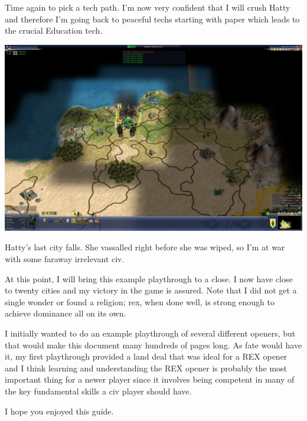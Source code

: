 \documentclass[10pt]{article}
\begin{document}
Time again to pick a tech path. I'm now very confident that I will crush Hatty and therefore I'm going back to
peaceful techs starting with paper which leads to the crucial Education tech.

\includegraphics[width=1.0\textwidth]{136}

Hatty's last city falls. She vassalled right before she was wiped, so I'm at war with some faraway irrelevant civ.

At this point, I will bring this example playthrough to a close. I now have close to twenty cities and my victory
in the game is assured. Note that I did not get a single wonder or found a religion; rex, when done well, is strong
enough to achieve dominance all on its own.

I initially wanted to do an example playthrough of several different openers, but that would make this document
many hundreds of pages long. As fate would have it, my first playthrough provided a land deal that was ideal
for a REX opener and I think learning and understanding the REX opener is probably the most important thing for
a newer player since it involves being competent in many of the key fundamental skills a civ player should have.

I hope you enjoyed this guide.
\end{document}
